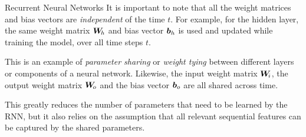 %
\begin{frame}{Recurrent Neural Networks}
It is important to note that all the weight matrices and bias vectors
are {\em independent} of the time $t$. For example, for the hidden
layer,
the same weight matrix  ${\boldsymbol W}_{\!h}$ and bias vector ${\boldsymbol b}_{h}$ is used and updated while training
the model,
over all time steps $t$. 


\medskip

This is an example of {\em parameter
sharing} or {\em weight tying} 
between different layers or components of a neural network. 
Likewise, the input weight matrix ${\boldsymbol W}_{\!i}$, the output weight
matrix ${\boldsymbol W}_{\!o}$ and the bias vector ${\boldsymbol b}_{o}$ are all shared across
time.


\medskip

This greatly reduces the number of parameters that
need to be learned by the RNN, but it also relies on the assumption that
all relevant sequential features can be captured by the shared
parameters.
\end{frame}
%
%

